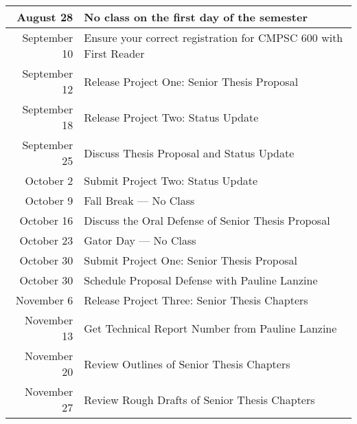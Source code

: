 \documentclass[11pt]{article}
\begin{document}
\begin{center}
\begin{longtable}{r|l}

\hline

August 28 & No class on the first day of the semester \\

\hline

September 10 & Ensure your correct registration for CMPSC 600 with First Reader            \\
September 12 & Release Project One: Senior Thesis Proposal         \\
September 18 & Release Project Two: Status Update \\
September 25 & Discuss Thesis Proposal and Status Update \\

\hline

October 2  & Submit Project Two: Status Update                \\
October 9 & Fall Break --- No Class                            \\
October 16 & Discuss the Oral Defense of Senior Thesis Proposal \\
October 23 & Gator Day --- No Class                             \\
October 30 & Submit Project One: Senior Thesis Proposal         \\
October 30 & Schedule Proposal Defense with Pauline Lanzine     \\

\hline

November 6  & Release Project Three: Senior Thesis Chapters     \\
November 13 & Get Technical Report Number from Pauline Lanzine \\
November 20 & Review Outlines of Senior Thesis Chapters        \\
November 27 & Review Rough Drafts of Senior Thesis Chapters    \\

\hline


\end{longtable}
\end{center}
\end{document}
